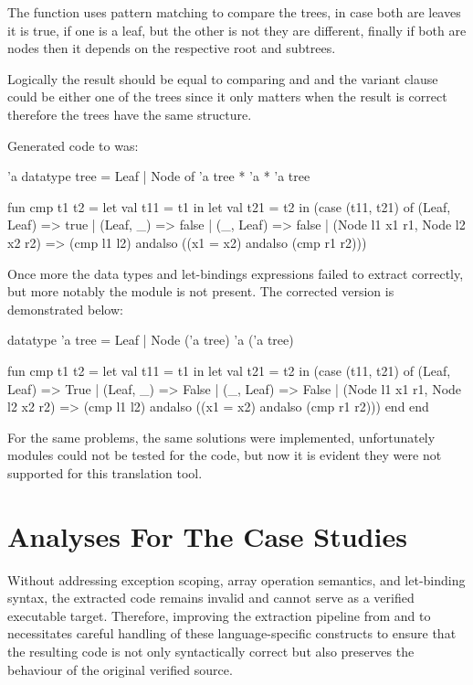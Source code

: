 The function  uses pattern matching to compare the trees, in case both are leaves it is true, if one is a leaf, but 
the other is not they are different, finally if both are nodes then it depends on the respective root and subtrees.

Logically the result should be equal to comparing  and  and the variant clause could be either one of 
the trees since it only matters when the result is correct therefore the trees have the same structure.

Generated code to \cml was:

\begin{cakeml}
'a datatype tree = Leaf | Node of 'a tree * 'a * 'a tree

fun cmp t1 t2 = let val t11 = t1 in
  let val t21 = t2 in
  (case (t11, t21) of
    (Leaf, Leaf) => true
  | (Leaf, _) => false
  | (_, Leaf) => false
  | (Node l1 x1 r1, Node l2 x2 r2) =>
    (cmp l1 l2) andalso ((x1 = x2) andalso (cmp r1 r2)))
\end{cakeml}

Once more the data types and let-bindings expressions failed to extract correctly, but more notably the module is not present.
The corrected version is demonstrated below:

\begin{cakeml}
datatype 'a tree = Leaf | Node ('a tree) 'a ('a tree)

fun cmp t1 t2 = let val t11 = t1 in
  let val t21 = t2 in
  (case (t11, t21) of
    (Leaf, Leaf) => True
  | (Leaf, _) => False
  | (_, Leaf) => False
  | (Node l1 x1 r1, Node l2 x2 r2) =>
    (cmp l1 l2) andalso ((x1 = x2) andalso (cmp r1 r2)))
    end
  end
\end{cakeml}

For the same problems, the same solutions were implemented, unfortunately modules could not be tested for the \cml code, but now
it is evident they were not supported for this translation tool.

\section{Analyses For The Case Studies}

Without addressing exception scoping, array operation semantics, and let-binding syntax, the extracted code remains invalid 
and cannot serve as a verified executable target. Therefore, improving the extraction pipeline from \ocaml and \gospel to 
\cml necessitates careful handling of these language-specific constructs to ensure that the resulting code is not only 
syntactically correct but also preserves the behaviour of the original verified source.
